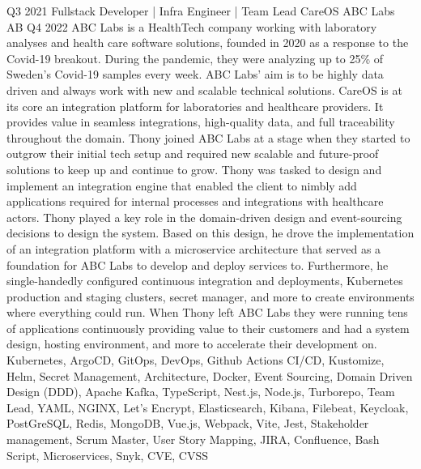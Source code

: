\begin{experiences}
    \experience
    {Q3 2021}   
    {Fullstack Developer | Infra Engineer | Team Lead}
    {CareOS}
    {ABC Labs AB}
    {Q4 2022} {
        ABC Labs is a HealthTech company working with laboratory analyses and health care software solutions, founded in 2020 as a response to the Covid-19 breakout. 
        During the pandemic, they were analyzing up to 25\% of Sweden's Covid-19 samples every week. 
        ABC Labs' aim is to be highly data driven and always work with new and scalable technical solutions.
        \newline \newline
        CareOS is at its core an integration platform for laboratories and healthcare providers.
        It provides value in seamless integrations, high-quality data, and full traceability throughout the domain.
        \newline \newline
        Thony joined ABC Labs at a stage when they started to outgrow their initial tech setup and required new scalable and future-proof solutions to keep up and continue to grow.
        Thony was tasked to design and implement an integration engine that enabled the client to nimbly add applications required for internal processes and integrations with healthcare actors.
        Thony played a key role in the domain-driven design and event-sourcing decisions to design the system.
        Based on this design, he drove the implementation of an integration platform with a microservice architecture that served as a foundation for ABC Labs to develop and deploy services to.
        Furthermore, he single-handedly configured continuous integration and deployments, Kubernetes production and staging clusters, secret manager, and more to create environments where everything could run. 
        When Thony left ABC Labs they were running tens of applications continuously providing value to their customers and had a system design, hosting environment, and more to accelerate their development on.
        \newline
    }
    {Kubernetes, ArgoCD, GitOps, DevOps, Github Actions CI/CD, Kustomize, Helm, Secret Management, Architecture, Docker, Event Sourcing, Domain Driven Design (DDD), Apache Kafka, TypeScript, Nest.js, Node.js, Turborepo, Team Lead, YAML, NGINX, Let's Encrypt, Elasticsearch, Kibana, Filebeat, Keycloak, PostGreSQL, Redis, MongoDB, Vue.js, Webpack, Vite, Jest, Stakeholder management, Scrum Master, User Story Mapping, JIRA, Confluence, Bash Script, Microservices, Snyk, CVE, CVSS}
    \emptySeparator
    

\end{experiences}
